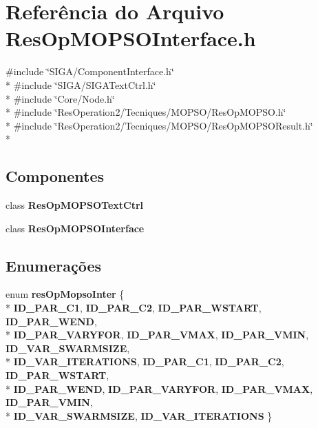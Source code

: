 \section{Referência do Arquivo Res\+Op\+M\+O\+P\+S\+O\+Interface.\+h}
\label{_2_tecniques_2_m_o_p_s_o_2_res_op_m_o_p_s_o_interface_8h}
{\ttfamily \#include \char`\"{}S\+I\+G\+A/\+Component\+Interface.\+h\char`\"{}}\\*
{\ttfamily \#include \char`\"{}S\+I\+G\+A/\+S\+I\+G\+A\+Text\+Ctrl.\+h\char`\"{}}\\*
{\ttfamily \#include \char`\"{}Core/\+Node.\+h\char`\"{}}\\*
{\ttfamily \#include \char`\"{}Res\+Operation2/\+Tecniques/\+M\+O\+P\+S\+O/\+Res\+Op\+M\+O\+P\+S\+O.\+h\char`\"{}}\\*
{\ttfamily \#include \char`\"{}Res\+Operation2/\+Tecniques/\+M\+O\+P\+S\+O/\+Res\+Op\+M\+O\+P\+S\+O\+Result.\+h\char`\"{}}\\*
\subsection*{Componentes}
\begin{DoxyCompactItemize}
\item 
class {\bf Res\+Op\+M\+O\+P\+S\+O\+Text\+Ctrl}
\item 
class {\bf Res\+Op\+M\+O\+P\+S\+O\+Interface}
\end{DoxyCompactItemize}
\subsection*{Enumerações}
\begin{DoxyCompactItemize}
\item 
enum {\bf res\+Op\+Mopso\+Inter} \{ \\*
{\bf I\+D\+\_\+\+P\+A\+R\+\_\+\+C1}, 
{\bf I\+D\+\_\+\+P\+A\+R\+\_\+\+C2}, 
{\bf I\+D\+\_\+\+P\+A\+R\+\_\+\+W\+S\+T\+A\+RT}, 
{\bf I\+D\+\_\+\+P\+A\+R\+\_\+\+W\+E\+ND}, 
\\*
{\bf I\+D\+\_\+\+P\+A\+R\+\_\+\+V\+A\+R\+Y\+F\+OR}, 
{\bf I\+D\+\_\+\+P\+A\+R\+\_\+\+V\+M\+AX}, 
{\bf I\+D\+\_\+\+P\+A\+R\+\_\+\+V\+M\+IN}, 
{\bf I\+D\+\_\+\+V\+A\+R\+\_\+\+S\+W\+A\+R\+M\+S\+I\+ZE}, 
\\*
{\bf I\+D\+\_\+\+V\+A\+R\+\_\+\+I\+T\+E\+R\+A\+T\+I\+O\+NS}, 
{\bf I\+D\+\_\+\+P\+A\+R\+\_\+\+C1}, 
{\bf I\+D\+\_\+\+P\+A\+R\+\_\+\+C2}, 
{\bf I\+D\+\_\+\+P\+A\+R\+\_\+\+W\+S\+T\+A\+RT}, 
\\*
{\bf I\+D\+\_\+\+P\+A\+R\+\_\+\+W\+E\+ND}, 
{\bf I\+D\+\_\+\+P\+A\+R\+\_\+\+V\+A\+R\+Y\+F\+OR}, 
{\bf I\+D\+\_\+\+P\+A\+R\+\_\+\+V\+M\+AX}, 
{\bf I\+D\+\_\+\+P\+A\+R\+\_\+\+V\+M\+IN}, 
\\*
{\bf I\+D\+\_\+\+V\+A\+R\+\_\+\+S\+W\+A\+R\+M\+S\+I\+ZE}, 
{\bf I\+D\+\_\+\+V\+A\+R\+\_\+\+I\+T\+E\+R\+A\+T\+I\+O\+NS}
 \}
\end{DoxyCompactItemize}
